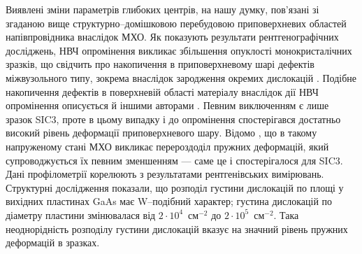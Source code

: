 \documentclass[a4paper,14pt,oneside,openany]{memoir}
\begin{document}
Виявлені зміни параметрів глибоких центрів, на нашу думку, пов'язані зі згаданою вище структурно--домішковою перебудовою приповерхневих областей напівпровідника внаслідок МХО.
Як показують результати рентгенографічних досліджень, НВЧ опромінення викликає збільшення опуклості монокристалічних зразків, що свідчить про накопичення в приповерхневому шарі дефектів міжвузольного типу,
зокрема внаслідок зародження окремих дислокацій  \cite{Boltovets,Konakova2012FTP}.
Подібне накопичення дефектів в поверхневій області матеріалу внаслідок дії НВЧ опромінення описується й іншими авторами \cite{Boltovets,Belyaev1998JTFr,Konakova2015}.
Певним виключенням є лише зразок SIC3, проте в цьому випадку і до опромінення спостерігався достатньо високий рівень
деформації приповерхневого шару.
Відомо \cite{Bacherikov2003r,Pashkov1994r,Boltovets,Kr1996,Milenin1994,BelyaevIntac}, що в такому напруженому стані МХО викликає перероздоділ пружних деформацій, який супроводжується їх певним зменшенням --- саме це і спостерігалося для SIC3.
Дані профілометрії корелюють з результатами рентгенівських вимірювань.
Структурні дослідження показали, що розподіл густини дислокацій по площі у вихідних пластинах GaAs має W--подібний характер;
густина дислокацій по діаметру пластини змінювалася від $2\cdot10^{4}$~см$^{-2}$ до $2\cdot10^{5}$~см$^{-2}$.
Така неоднорідність розподілу густини дислокацій вказує на значний рівень пружних деформацій в зразках.
\end{document}
